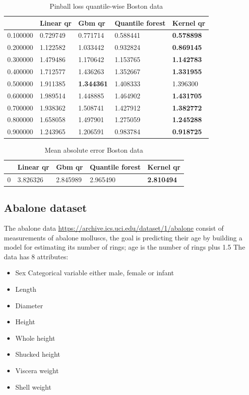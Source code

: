 \begin{table}
    \caption{Pinball loss quantile-wise Boston data}
\begin{tabular}{lllll}
\toprule
    & Linear qr & Gbm qr & Quantile forest & Kernel qr \\
\midrule
0.100000 & 0.729749 & 0.771714 & 0.588441 & \textbf{0.578898} \\
0.200000 & 1.122582 & 1.033442 & 0.932824 & \textbf{0.869145} \\
0.300000 & 1.479486 & 1.170642 & 1.153765 & \textbf{1.142783} \\
0.400000 & 1.712577 & 1.436263 & 1.352667 & \textbf{1.331955} \\
0.500000 & 1.911385 & \textbf{1.344361} & 1.408333 & 1.396300 \\
0.600000 & 1.989514 & 1.448885 & 1.464902 & \textbf{1.431705} \\
0.700000 & 1.938362 & 1.508741 & 1.427912 & \textbf{1.382772} \\
0.800000 & 1.658058 & 1.497901 & 1.275059 & \textbf{1.245288} \\
0.900000 & 1.243965 & 1.206591 & 0.983784 & \textbf{0.918725} \\
\bottomrule
\end{tabular}
\end{table}
        
\begin{table}
\caption{Mean absolute error Boston data}    
\begin{tabular}{lllll}
\toprule
    & Linear qr & Gbm qr & Quantile forest & Kernel qr \\
\midrule
0 & 3.826326 & 2.845989 & 2.965490 & \textbf{2.810494} \\
\bottomrule
\end{tabular}

\end{table}

\subsection{Abalone dataset}
The abalone data \href{https://archive.ics.uci.edu/dataset/1/abalone}{https://archive.ics.uci.edu/dataset/1/abalone} consist of measurements of abalone molluscs, the goal is predicting their age by building a model for estimating its number of rings; age is the number of rings plus 1.5
The data has 8 attributes:
\begin{itemize}
    \item Sex Categorical variable either male, female or infant
    \item Length
    \item Diameter
    \item Height
    \item Whole height
    \item Shucked height
    \item Viscera weight
    \item Shell weight
\end{itemize}

